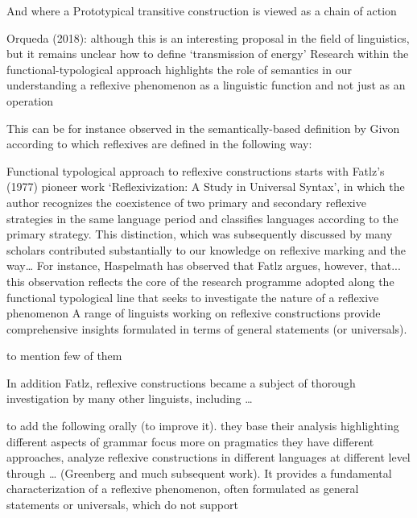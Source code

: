 \documentclass[output=paper]{langscibook}
\begin{document}
And where a Prototypical transitive construction is viewed as a chain of action

Orqueda (2018): although this is an interesting proposal in the field of linguistics,  but it remains unclear how to define ‘transmission of energy’ 
Research within the functional-typological approach highlights the role of semantics in our understanding a reflexive phenomenon as a linguistic function and not just as an operation 

This can be for instance observed in the semantically-based definition by Givon according to which reflexives are defined in the following way:

Functional typological approach to reflexive constructions starts with Fatlz’s  (1977) pioneer work ‘Reflexivization: A Study in Universal Syntax’, in which the author recognizes the coexistence of two primary and secondary reflexive strategies in the same language period and classifies languages according to the primary strategy.
This distinction, which was subsequently discussed by many scholars 
contributed substantially to our knowledge on reflexive marking and the way… 
For instance, Haspelmath has observed that 
Fatlz argues, however, that... 
this observation reflects the core of the research programme adopted along the  functional typological line 
that seeks to investigate the nature of a reflexive phenomenon
A range of linguists working on reflexive constructions provide comprehensive insights formulated in terms of general statements (or universals).

to mention few of them

In addition Fatlz, reflexive constructions became a subject of thorough investigation by many other linguists, including …

to add the following orally (to improve it).
they base their analysis highlighting different aspects of grammar focus more on pragmatics 
they have different approaches, analyze reflexive constructions in different languages at different level
through … (Greenberg and much subsequent work). 
It provides a fundamental characterization of a reflexive phenomenon, often formulated as general statements or universals, which do not support 					





{\sloppy\printbibliography[heading=subbibliography,notkeyword=this]}
\end{document}
